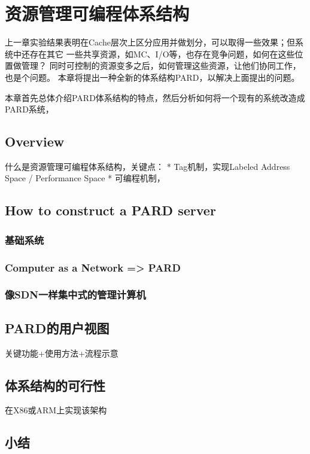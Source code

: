

\chapter{资源管理可编程体系结构}
\label{cha:pard}

上一章实验结果表明在Cache层次上区分应用并做划分，可以取得一些效果；但系统中还存在其它
一些共享资源，如MC、I/O等，也存在竞争问题，如何在这些位置做管理？
同时可控制的资源变多之后，如何管理这些资源，让他们协同工作，也是个问题。
本章将提出一种全新的体系结构PARD，以解决上面提出的问题。

本章首先总体介绍PARD体系结构的特点，然后分析如何将一个现有的系统改造成PARD系统，


\section{Overview}

什么是资源管理可编程体系结构，关键点：
 * Tag机制，实现Labeled Address Space / Performance Space
 * 可编程机制，


\section{How to construct a PARD server}

\subsection{基础系统}

\subsection{Computer as a Network => PARD}

\subsection{像SDN一样集中式的管理计算机}


\section{PARD的用户视图}

关键功能+使用方法+流程示意


\section{体系结构的可行性}

在X86或ARM上实现该架构


\section{小结}



